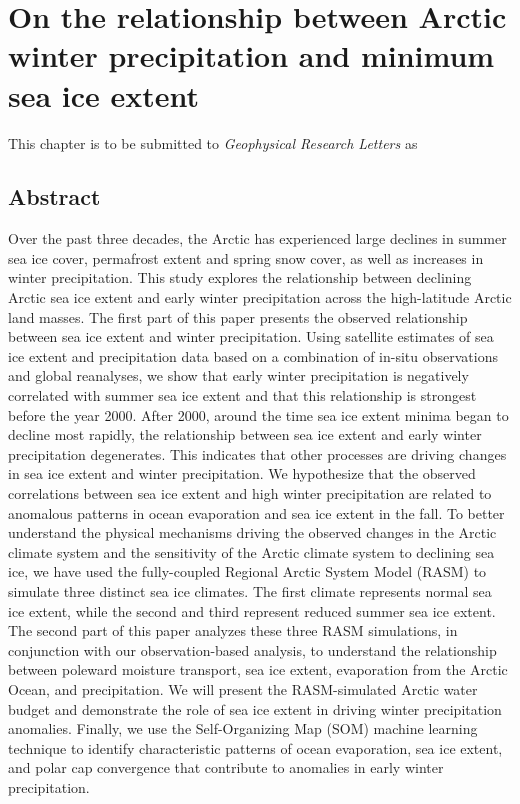 
\chapter{On the relationship between Arctic winter precipitation and minimum sea ice extent}
\label{chap:winter_prec}

This chapter is to be submitted to \textit{Geophysical Research Letters} as


\section*{Abstract}

Over the past three decades, the Arctic has experienced large declines in summer sea ice cover, permafrost extent and spring snow cover, as well as increases in winter precipitation.
This study explores the relationship between declining Arctic sea ice extent and early winter precipitation across the high-latitude Arctic land masses.
The first part of this paper presents the observed relationship between sea ice extent and winter precipitation.
Using satellite estimates of sea ice extent and precipitation data based on a combination of in-situ observations and global reanalyses, we show that early winter precipitation is negatively correlated with summer sea ice extent and that this relationship is strongest before the year 2000.
After 2000, around the time sea ice extent minima began to decline most rapidly, the relationship between sea ice extent and early winter precipitation degenerates.
This indicates that other processes are driving changes in sea ice extent and winter precipitation.
We hypothesize that the observed correlations between sea ice extent and high winter precipitation are related to anomalous patterns in ocean evaporation and sea ice extent in the fall.
To better understand the physical mechanisms driving the observed changes in the Arctic climate system and the sensitivity of the Arctic climate system to declining sea ice, we have used the fully-coupled Regional Arctic System Model (RASM) to simulate three distinct sea ice climates.
The first climate represents normal sea ice extent, while the second and third represent reduced summer sea ice extent.
The second part of this paper analyzes these three RASM simulations, in conjunction with our observation-based analysis, to understand the relationship between poleward moisture transport, sea ice extent, evaporation from the Arctic Ocean, and precipitation.
We will present the RASM-simulated Arctic water budget and demonstrate the role of sea ice extent in driving winter precipitation anomalies.
Finally, we use the Self-Organizing Map (SOM) machine learning technique to identify characteristic patterns of ocean evaporation, sea ice extent, and polar cap convergence that contribute to anomalies in early winter precipitation.


